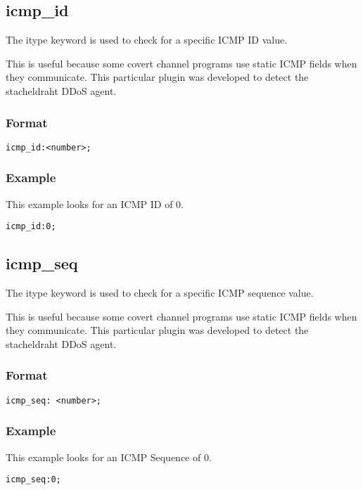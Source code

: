 \documentclass[english]{report}
\begin{document}
\subsection{icmp\_id}

The itype keyword is used to check for a specific ICMP ID value.

This is useful because some covert channel programs use static ICMP fields when
they communicate.  This particular plugin was developed to detect the
stacheldraht DDoS agent.

\subsubsection{Format}

\begin{verbatim}
icmp_id:<number>;
\end{verbatim}

\subsubsection{Example}

This example looks for an ICMP ID of 0.
\begin{verbatim}
icmp_id:0;
\end{verbatim}

\subsection{icmp\_seq}

The itype keyword is used to check for a specific ICMP sequence value.

This is useful because some covert channel programs use static ICMP fields when
they communicate.  This particular plugin was developed to detect the
stacheldraht DDoS agent.

\subsubsection{Format}

\begin{verbatim}
icmp_seq: <number>;
\end{verbatim}

\subsubsection{Example}

This example looks for an ICMP Sequence of 0.
\begin{verbatim}
icmp_seq:0;
\end{verbatim}
\end{document}
